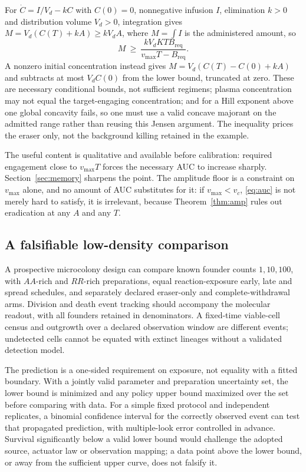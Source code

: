 For $\dot C=I/V_d-kC$ with $C(0)=0$, nonnegative infusion $I$, elimination
$k>0$ and distribution volume $V_d>0$, integration gives
$M=V_d(C(T)+kA)\ge kV_dA$, where $M=\int I$ is the administered amount, so
\begin{equation}\label{eq:mass}
 M\ \ge\ \frac{kV_dKTB_{\mathrm{req}}}{v_{\max}T-B_{\mathrm{req}}} .
\end{equation}
A nonzero initial concentration instead gives $M=V_d(C(T)-C(0)+kA)$ and
subtracts at most $V_dC(0)$ from the lower bound, truncated at zero. These are
necessary conditional bounds, not sufficient regimens; plasma concentration may
not equal the target-engaging concentration; and for a Hill exponent above one
global concavity fails, so one must use a valid concave majorant on the admitted
range rather than reusing this Jensen argument. The inequality prices the eraser
only, not the background killing retained in the example.

The useful content is qualitative and available before calibration: required
engagement close to $v_{\max}T$ forces the necessary AUC to increase sharply.
Section~\ref{sec:memory} sharpens the point. The amplitude floor is a constraint
on $v_{\max}$ alone, and no amount of AUC substitutes for it: if
$v_{\max}<v_c$, \eqref{eq:auc} is not merely hard to satisfy, it is irrelevant,
because Theorem~\ref{thm:amp} rules out eradication at any $A$ and any $T$.

\subsection{A falsifiable low-density comparison}

A prospective microcolony design can compare known founder counts $1,10,100$,
with $AA$-rich and $RR$-rich preparations, equal reaction-exposure early, late
and spread schedules, and separately declared eraser-only and
complete-withdrawal arms. Division and death event tracking should accompany
the molecular readout, with all founders retained in denominators. A fixed-time
viable-cell census and outgrowth over a declared observation window are
different events; undetected cells cannot be equated with extinct lineages
without a validated detection model.

The prediction is a one-sided requirement on exposure, not equality with a
fitted boundary. With a jointly valid parameter and preparation uncertainty
set, the lower bound is minimized and any policy upper bound maximized over the
set before comparing with data. For a simple fixed protocol and independent
replicates, a binomial confidence interval for the correctly observed event can
test that propagated prediction, with multiple-look error controlled in advance.
Survival significantly below a valid lower bound would challenge the adopted
source, actuator law or observation mapping; a data point above the lower bound,
or away from the sufficient upper curve, does not falsify it.


